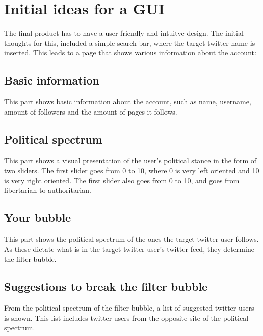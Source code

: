 \section{Initial ideas for a GUI} \label{sec:GUI}
The final product has to have a user-friendly and intuitve design. The initial
thoughts for this, included a simple search bar, where the target twitter name
is inserted. This leads to a page that shows various information about the
account:
\subsection*{Basic information}
This part shows basic information about the account, such as name, username,
amount of followers and the amount of pages it follows.
\subsection*{Political spectrum}
This part shows a visual presentation of the user's political stance in the form
of two sliders. The first slider goes from 0 to 10, where 0 is very left
oriented and 10 is very right oriented. The first slider also goes from 0 to 10,
and goes from libertarian to authoritarian.
\subsection*{Your bubble}
This part shows the political spectrum of the ones the target twitter user
follows. As these dictate what is in the target twitter user's twitter feed,
they determine the filter bubble.
 \subsection*{Suggestions to break the filter bubble}
 From the political spectrum of the filter bubble, a list of suggested twitter
 users is shown. This list includes twitter users from the opposite site of the
 political spectrum.
